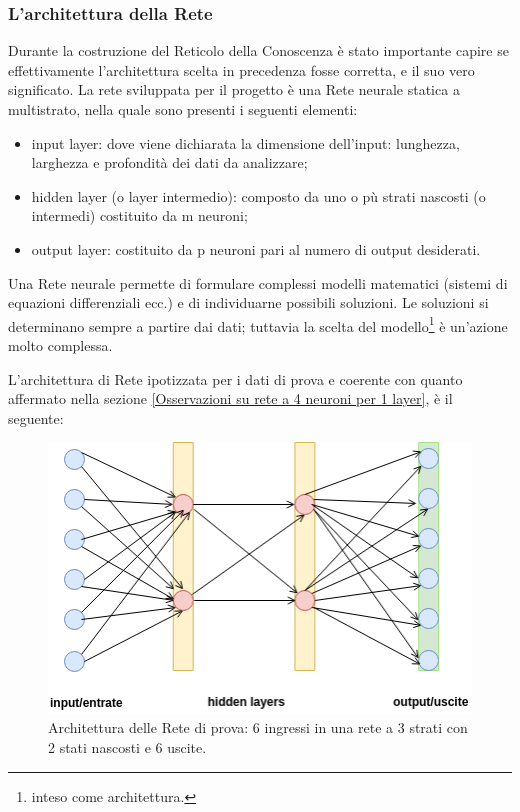 \subsubsection{L'architettura della Rete}
\label{L'architettura della Rete}
Durante la costruzione del Reticolo della Conoscenza \`e stato importante capire se effettivamente l'architettura scelta in precedenza fosse corretta, e il suo vero significato. La rete sviluppata per il progetto \`e una Rete neurale statica a multistrato, nella quale sono presenti i seguenti elementi:
\begin{itemize}
\item input layer: dove viene dichiarata la dimensione dell'input: lunghezza, larghezza e profondit\`a dei dati da analizzare;
\item hidden layer (o layer intermedio): composto da uno o p\`u strati nascosti (o intermedi) costituito da m neuroni;
\item output layer:  costituito da p neuroni pari al numero di output desiderati.
\end{itemize}
\noindent 
Una Rete neurale permette di formulare complessi modelli matematici (sistemi di equazioni differenziali ecc.) e di individuarne possibili soluzioni. Le soluzioni si determinano sempre a partire dai dati; tuttavia la scelta del modello\footnote{inteso come architettura.} \`e un'azione molto complessa.

L'architettura di Rete ipotizzata per i dati di prova e coerente con quanto affermato nella sezione \ref{Osservazioni su rete a 4 neuroni per 1 layer}, è il seguente:
\noindent
\begin{figure}[H]
\centering
	\includegraphics[width=0.60\linewidth]{./image/architettura-rete-prova.png}
	\caption{Architettura delle Rete di prova: 6 ingressi in una rete a 3 strati con 2 stati nascosti e 6 uscite.}
	\label{Archittettura delle Rete di prova: 6 ingressi in una rete a 3 strati con 2 stati nascosti e 6 uscite.}
\end{figure}
\noindent


